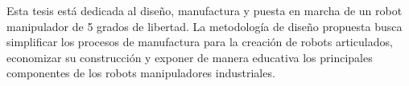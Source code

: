 


\begin{abstracts}        %

Esta tesis está dedicada al diseño, manufactura y puesta en marcha de un robot manipulador de 5 grados de libertad. La metodología de diseño propuesta busca simplificar los procesos de manufactura para la creación de robots articulados, economizar su construcción y exponer de manera educativa los principales componentes de los robots manipuladores industriales.

\end{abstracts}


